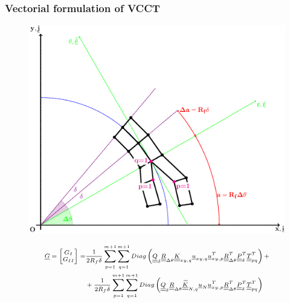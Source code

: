 \documentclass[first,firstsupp,lastsupp,last,hyperref,table]{ETHclass}
\begin{document}
\begin{frame}
\frametitle{\vspace{0.25cm}\small Vectorial formulation of VCCT}
\vspace{-.75cm}
\centering
\begin{figure}
\centering
\includegraphics[height=0.5\textheight]{VCCT-linear.pdf}
\end{figure}
\begin{equation*}
\scriptsize
\begin{split}
\underline{G}=\begin{bmatrix}
G_{I} \\
G_{II}
\end{bmatrix}=&\frac{1}{2R_{f}\delta}\sum_{p=1}^{m+1}\sum_{q=1}^{m+1}Diag\left(\underline{\underline{Q}}_{\delta}\underline{\underline{R}}_{\Delta\theta}\underline{\underline{K}}_{xy,q}\underline{u}_{xy,q}\underline{u}_{xy,p}^{T}\underline{\underline{R}}_{\Delta\theta}^{T}\underline{\underline{P}}_{\delta}^{T}\underline{\underline{T}}_{pq}^{T}\right)+\\
&+\frac{1}{2R_{f}\delta}\sum_{p=1}^{m+1}\sum_{q=1}^{m+1}Diag\left(\underline{\underline{Q}}_{\delta}\underline{\underline{R}}_{\Delta\theta}\underline{\underline{\widetilde{K}}}_{N,q}\underline{u}_{N}\underline{u}_{xy,p}^{T}\underline{\underline{R}}_{\Delta\theta}^{T}\underline{\underline{P}}_{\delta}^{T}\underline{\underline{T}}_{pq}^{T}\right)
\end{split}
\end{equation*}
\end{frame}
\end{document}
